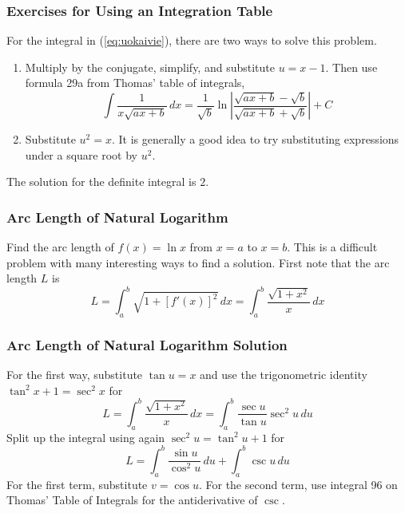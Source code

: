 \documentclass[xcolor=dvipsnames]{beamer}
\begin{document}
\begin{frame}
  \frametitle{Exercises for Using an Integration Table}
For the integral in (\ref{eq:uokaivie}), there are two ways to solve
this problem.
\begin{enumerate}
\item Multiply by the conjugate, simplify, and substitute $u=x-1$.
  Then use formula 29a from Thomas' table of integrals,
  \begin{equation}
    \label{eq:taxeepei}
    \int\frac{1}{x\sqrt{ax+b}}\,dx=\frac{1}{\sqrt{b}}\ln\left\vert\frac{\sqrt{ax+b}-\sqrt{b}}{\sqrt{ax+b}+\sqrt{b}}\right\vert+C
  \end{equation}
\item Substitute $u^{2}=x$. It is generally a good idea to try
  substituting expressions under a square root by $u^{2}$.
\end{enumerate}
The solution for the definite integral is $2$.
\end{frame}

\begin{frame}
  \frametitle{Arc Length of Natural Logarithm}
   Find the arc length of
  $f(x)=\ln{}x$ from $x=a$ to $x=b$. This is a difficult problem with
  many interesting ways to find a solution. First note that the arc
  length $L$ is
  \begin{equation}
    \label{eq:theijaeg}
    L=\int_{a}^{b}\sqrt{1+[f'(x)]^{2}}\,dx=\int_{a}^{b}\frac{\sqrt{1+x^{2}}}{x}\,dx
  \end{equation}
\end{frame}

\begin{frame}
  \frametitle{Arc Length of Natural Logarithm Solution}
  For the first way, substitute $\tan{}u=x$ and use the trigonometric
  identity $\tan^{2}x+1=\sec^{2}x$ for
  \begin{equation}
    \label{eq:phahpiqu}
    L=\int_{a}^{b}\frac{\sqrt{1+x^{2}}}{x}\,dx=\int_{a}^{b}\frac{\sec{}u}{\tan{}u}\sec^{2}u\,du
  \end{equation}
  Split up the integral using again $\sec^{2}u=\tan^{2}u+1$ for
  \begin{equation}
    \label{eq:beidahch}
    L=\int_{a}^{b}\frac{\sin{}u}{\cos^{2}u}\,du+\int_{a}^{b}\csc{}u\,du
  \end{equation}
  For the first term, substitute $v=\cos{}u$. For the second term, use
  integral 96 on Thomas' Table of Integrals for the antiderivative of
  $\csc$.
\end{frame}
\end{document}
